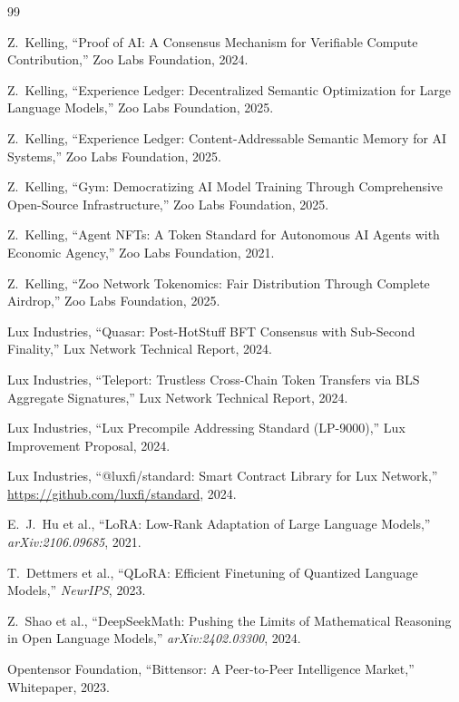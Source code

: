 \begin{thebibliography}{99}

Z.~Kelling, ``Proof of AI: A Consensus Mechanism for Verifiable Compute Contribution,'' Zoo Labs Foundation, 2024.

Z.~Kelling, ``Experience Ledger: Decentralized Semantic Optimization for Large Language Models,'' Zoo Labs Foundation, 2025.

Z.~Kelling, ``Experience Ledger: Content-Addressable Semantic Memory for AI Systems,'' Zoo Labs Foundation, 2025.

Z.~Kelling, ``Gym: Democratizing AI Model Training Through Comprehensive Open-Source Infrastructure,'' Zoo Labs Foundation, 2025.

Z.~Kelling, ``Agent NFTs: A Token Standard for Autonomous AI Agents with Economic Agency,'' Zoo Labs Foundation, 2021.

Z.~Kelling, ``Zoo Network Tokenomics: Fair Distribution Through Complete Airdrop,'' Zoo Labs Foundation, 2025.

Lux Industries, ``Quasar: Post-HotStuff BFT Consensus with Sub-Second Finality,'' Lux Network Technical Report, 2024.

Lux Industries, ``Teleport: Trustless Cross-Chain Token Transfers via BLS Aggregate Signatures,'' Lux Network Technical Report, 2024.

Lux Industries, ``Lux Precompile Addressing Standard (LP-9000),'' Lux Improvement Proposal, 2024.

Lux Industries, ``@luxfi/standard: Smart Contract Library for Lux Network,'' \url{https://github.com/luxfi/standard}, 2024.

E.~J.~Hu et al., ``LoRA: Low-Rank Adaptation of Large Language Models,'' \textit{arXiv:2106.09685}, 2021.

T.~Dettmers et al., ``QLoRA: Efficient Finetuning of Quantized Language Models,'' \textit{NeurIPS}, 2023.

Z.~Shao et al., ``DeepSeekMath: Pushing the Limits of Mathematical Reasoning in Open Language Models,'' \textit{arXiv:2402.03300}, 2024.

Opentensor Foundation, ``Bittensor: A Peer-to-Peer Intelligence Market,'' Whitepaper, 2023.


\end{thebibliography}

